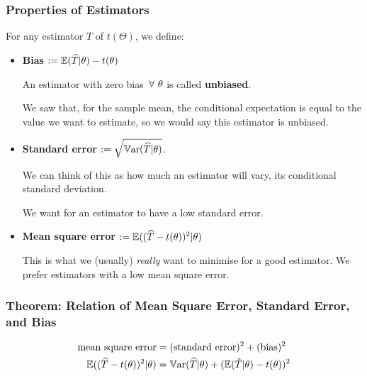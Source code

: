 \documentclass[a4paper]{article}
\begin{document}
            \subsubsection{Properties of Estimators}
                \begin{definition}
                    For any estimator $\widehat T$ of $t(\Theta)$, we define:

                    \begin{itemize}
                        \item \textbf{Bias} $:= \mathbb{E}(\widehat T | \theta) -
                            t(\theta)$

                            An estimator with zero bias $\,\forall\,\, \theta$ is called
                            \textbf{unbiased}.

                            We saw that, for the sample mean, the conditional
                            expectation is equal to the value we want to
                            estimate, so we would say this estimator is
                            unbiased.

                        \item \textbf{Standard error} $:= \sqrt{\mathbb{V}\text{ar}(\widehat T
                            | \theta)}$.

                            We can think of this as how much an estimator will
                            vary, its conditional standard deviation.

                            We want for an estimator to have a low standard
                            error.

                        \item \textbf{Mean square error} $:= \mathbb{E}((\widehat T -
                            t(\theta))^2 | \theta)$

                            This is what we (usually) \textit{really} want to
                            minimise for a good estimator. We prefer estimators
                            with a low mean square error.
                    \end{itemize}
                \end{definition}

            \subsubsection{Theorem: Relation of Mean Square Error, Standard
            Error, and Bias}
                \begin{align*}
                    \text{mean square error} & = (\text{standard error})^2 +
                        (\text{bias})^2 \\
                    \mathbb{E}((\widehat T - t(\theta))^2 | \theta) & = \mathbb{V}\text{ar}(\widehat T
                        | \theta) + (\mathbb{E}(\hat T | \theta) - t(\theta))^2
                \end{align*}
\end{document}
